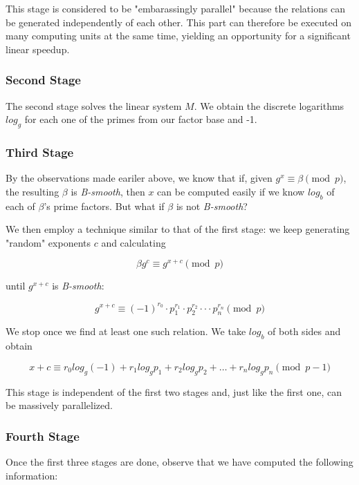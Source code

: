 \documentclass{article}
\begin{document}
        This stage is considered to be "embarassingly parallel" because the relations can be generated independently of each other. This part can therefore be executed on many computing units at the same time, yielding an opportunity for a significant linear speedup.

        \subsubsection{Second Stage}

        The second stage solves the linear system $M$. We obtain the discrete logarithms $log_g$ for each one of the primes from our factor base and -1.

        \subsubsection{Third Stage}

        By the observations made eariler above, we know that if, given $g^x \equiv \beta \pmod{p}$, the resulting $\beta$ is \emph{B-smooth}, then $x$ can be computed easily if we know $log_b$ of each of $\beta$'s prime factors. But what if $\beta$ is not \emph{B-smooth}?

        We then employ a technique similar to that of the first stage: we keep generating "random" exponents $c$ and calculating

        $$\beta g^c \equiv g^{x+c} \pmod{p}$$

        until $g^{x+c}$ is \emph{B-smooth}:

        $$g^{x+c} \equiv (-1)^{r_0} \cdot p_1^{r_1} \cdot p_2^{r_2} \cdot \cdot \cdot p_n^{r_n} \pmod{p}$$

        We stop once we find at least one such relation. We take $log_b$ of both sides and obtain

        $$x+c \equiv r_0 log_g (-1) + r_1 log_g p_1 + r_2 log_g p_2 + \ldots + r_n log_g p_n \pmod{p-1}$$

        This stage is independent of the first two stages and, just like the first one, can be massively parallelized.

        \subsubsection{Fourth Stage}

        Once the first three stages are done, observe that we have computed the following information:
\end{document}
